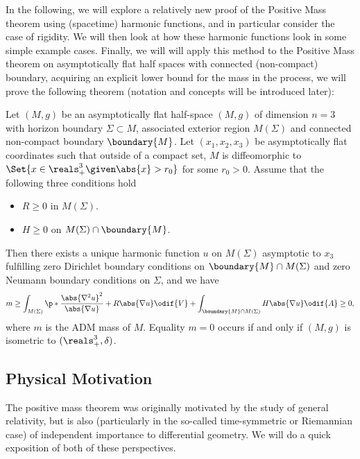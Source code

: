 \documentclass[titlepage,numbers=noenddot,headinclude,oneside,%
footinclude=true,cleardoublepage=empty,%
BCOR=5mm,paper=a4,fontsize=11pt,%
english,%
]{scrartcl}
\begin{document}
In the following, we will explore a relatively new proof of the Positive Mass theorem using (spacetime) harmonic functions, and in particular consider the case of rigidity. We will then look at how these harmonic functions look in some simple example cases. Finally, we will will apply this method to the Positive Mass theorem on asymptotically flat half spaces with connected (non-compact) boundary, acquiring an explicit lower bound for the mass in the process, \ie we will prove the following theorem (notation and concepts will be introduced later):

\begin{theorem}
    Let \( (M,g) \) be an asymptotically flat half-space \( (M,g) \) of dimension \( n=3 \) with horizon boundary \( \Sigma\subset M \), associated exterior region \( M(\Sigma) \) and connected non-compact boundary \( \boundary{M} \). Let \( (x_1,x_2,x_3) \) be asymptotically flat coordinates such that outside of a compact set, \( M \) is diffeomorphic to \( \Set{x\in \reals^3_+\given \abs{x}>r_0} \) for some \( r_0>0 \). Assume that the following three conditions hold
    \begin{itemize}
        \item \( R\geq 0 \) in \( M(\Sigma) \).
        \item \( H \geq 0 \) on \( M(\Sigma)\cap \boundary{M} \).
    \end{itemize}
    Then there exists a unique harmonic function \( u \) on \( M(\Sigma) \) asymptotic to \( x_3 \) fulfilling zero Dirichlet boundary conditions on \( \boundary{M}\cap M(\Sigma) \) and zero Neumann boundary conditions on \( \Sigma \), and we have
    \begin{equation*}
        m\geq \int_{M(\Sigma)}\p*{\frac{\abs{\nabla^2 u}^2}{\abs{\nabla u}}+R\abs{\nabla u}}\odif{V}+\int_{\boundary{M}\cap M(\Sigma)}H\abs{\nabla u}\odif{A}\geq 0,
    \end{equation*}
    where \( m \) is the ADM mass of \( M \). Equality \( m=0 \) occurs if and only if \( (M,g) \) is isometric to \( (\reals^3_+,\delta) \). 
\end{theorem}
\subsection{Physical Motivation}
The positive mass theorem was originally motivated by the study of general relativity, but is also (particularly in the so-called time-symmetric or Riemannian case) of independent importance to differential geometry. We will do a quick exposition of both of these perspectives.
\end{document}
